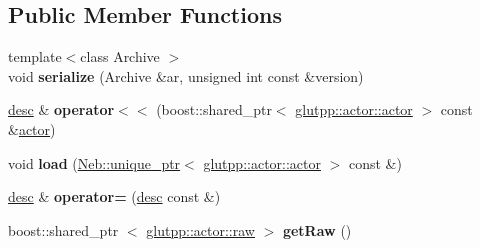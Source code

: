 \subsection*{\-Public \-Member \-Functions}
\begin{DoxyCompactItemize}
\item 
\hypertarget{classglutpp_1_1actor_1_1desc_a8ce066aed9d7b08f45b0588d85cecbf5}{{\footnotesize template$<$class Archive $>$ }\\void {\bfseries serialize} (\-Archive \&ar, unsigned int const \&version)}\label{classglutpp_1_1actor_1_1desc_a8ce066aed9d7b08f45b0588d85cecbf5}

\item 
\hypertarget{classglutpp_1_1actor_1_1desc_ab2b0934debb56da68c57eeb6b84405da}{\hyperlink{classglutpp_1_1actor_1_1desc}{desc} \& {\bfseries operator$<$$<$} (boost\-::shared\-\_\-ptr$<$ \hyperlink{classglutpp_1_1actor_1_1actor}{glutpp\-::actor\-::actor} $>$ const \&\hyperlink{classglutpp_1_1actor_1_1actor}{actor})}\label{classglutpp_1_1actor_1_1desc_ab2b0934debb56da68c57eeb6b84405da}

\item 
\hypertarget{classglutpp_1_1actor_1_1desc_a8e33681c394eff13c13739b58225a126}{void {\bfseries load} (\hyperlink{classNeb_1_1unique__ptr}{\-Neb\-::unique\-\_\-ptr}$<$ \hyperlink{classglutpp_1_1actor_1_1actor}{glutpp\-::actor\-::actor} $>$ const \&)}\label{classglutpp_1_1actor_1_1desc_a8e33681c394eff13c13739b58225a126}

\item 
\hypertarget{classglutpp_1_1actor_1_1desc_aec64f60a2aa08873c91b60189bec69e4}{\hyperlink{classglutpp_1_1actor_1_1desc}{desc} \& {\bfseries operator=} (\hyperlink{classglutpp_1_1actor_1_1desc}{desc} const \&)}\label{classglutpp_1_1actor_1_1desc_aec64f60a2aa08873c91b60189bec69e4}

\item 
\hypertarget{classglutpp_1_1actor_1_1desc_ad0b57adbb0fca6582ebf3bc9a2e3c3ac}{boost\-::shared\-\_\-ptr\*
$<$ \hyperlink{classglutpp_1_1actor_1_1raw}{glutpp\-::actor\-::raw} $>$ {\bfseries get\-Raw} ()}\label{classglutpp_1_1actor_1_1desc_ad0b57adbb0fca6582ebf3bc9a2e3c3ac}

\end{DoxyCompactItemize}
